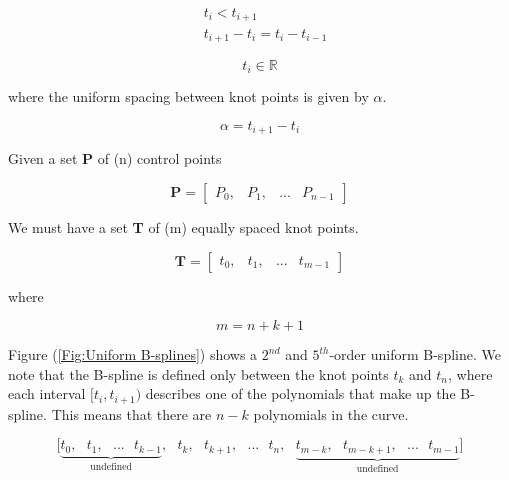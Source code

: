\documentclass{article}
\begin{document}
\begin{equation}
    \begin{aligned}
        & t_i < t_{i+1} \\
        & t_{i+1} - t_i = t_{i} - t_{i-1}
    \end{aligned}
\end{equation}

\begin{equation}
    t_i \in \mathbb{R} 
\end{equation}

where the uniform spacing between knot points is given by \(\alpha\).

\begin{equation}
    \alpha = t_{i+1} - t_i
\end{equation}


Given a set \textbf{P} of (n) control points

\begin{equation}
    \textbf{P} = \begin{bmatrix} P_0, & P_1, & ... & P_{n-1} \end{bmatrix}
\end{equation}

We must have a set \textbf{T} of (m) equally spaced knot points.

\begin{equation}
    \textbf{T} = \begin{bmatrix} t_0, & t_1 , & ... & t_{m-1} \end{bmatrix}
\end{equation}

where 

\begin{equation}
    m = n + k + 1
\end{equation}

Figure (\ref{Fig:Uniform B-splines}) shows a \(2^{nd}\) and \(5^{th}\)-order uniform B-spline. We note that the B-spline is defined only between the knot points \(t_k\) and \(t_n\), where each interval \([t_i , t_{i+1})\) describes one of the polynomials that make up the B-spline. This means that there are \(n-k\) polynomials in the curve.

\begin{equation}
    \Big[ \underbrace{t_0, \text{ } t_1,  \text{ } ... \text{ } t_{k-1}}_{\text{undefined}}, \text{ } t_k, \text{ } t_{k+1}, \text{ } ... \text{ } t_n, \text{ } \underbrace{t_{m-k}, \text{ } t_{m-k+1}, \text{ } ... \text{ } t_{m-1}}_{\text{undefined}} \Big]
\end{equation}
\end{document}
